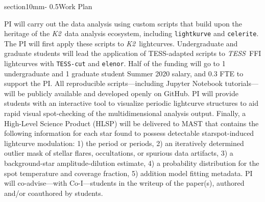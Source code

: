 \documentclass[letterpaper,12pt]{article}
\makeatletter
\renewcommand{\section}{\@startsection%
{section}{1}{0mm}{-\baselineskip}%
{0.5\baselineskip}{\normalfont\Large\bfseries}}%
\newcommand{\tess}{{\it TESS}}
\newcommand{\ktwo}{{\it K2}}
\makeatother
\begin{document}
\section{Work Plan}

PI will carry out the data analysis using custom scripts that build upon the heritage of the \ktwo\ data analysis ecosystem, including \texttt{lightkurve} and \texttt{celerite}.  The PI will first apply these scripts to \ktwo\ lightcurves.  Undergraduate and graduate students will lead the application of TESS-adapted scripts to \tess\ FFI lightcurves with \texttt{TESS-cut} and \texttt{elenor}.  Half of the funding will go to 1 undergraduate and 1 graduate student Summer 2020 salary, and 0.3 FTE to support the PI.  All reproducible scripts---including Jupyter Notebook tutorials---will be publicly available and developed openly on GitHub.
PI will provide students with an interactive tool to visualize periodic lightcurve structures to aid rapid visual spot-checking of the multidimensional analysis output.  Finally, a High-Level Science Product (HLSP) will be delivered to MAST that contains the following information for each star found to possess detectable starspot-induced lightcurve modulation: 1) the period or periods, 2) an iteratively determined outlier mask of stellar flares, occultations, or spurious data artifacts, 3) a background-star amplitude-dilution estimate, 4) a probability distribution for the spot temperature and coverage fraction, 5) addition model fitting metadata.  PI will co-advise---with Co-I---students in the writeup of the paper(s), authored and/or coauthored by students.


\newpage


\end{document}
